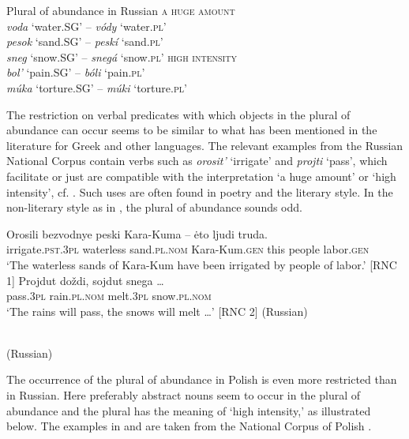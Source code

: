 \documentclass[output=paper,colorlinks,citecolor=brown,
]{langscibook}
\begin{document}
\ea\label{ex:41}	
Plural of abundance in Russian \citep[473]{Svedova1980} 
\ea \textsc{a huge amount}\\\textit{voda} `water.SG' -- \textit{vódy} `water.\textsc{pl}'\\ \textit{pesok} `sand.SG' -- \textit{peskí} `sand.\textsc{pl}'\\ 	\textit{sneg} `snow.SG' -- \textit{snegá} `snow.\textsc{pl}' 
\ex \textsc{high intensity}\\  \textit{bol'} `pain.SG' -- \textit{bóli} `pain.\textsc{pl}'\\ \textit{múka} `torture.SG' -- \textit{múki} `torture.\textsc{pl}'
\z\z
	
\noindent The restriction on verbal predicates with which objects in the plural of abundance can occur seems to be similar to what has been mentioned in the literature for Greek and other languages. The relevant examples from the Russian National Corpus contain verbs such as \textit{orosit'} `irrigate' and \textit{projti} `pass', which facilitate or just are compatible with the interpretation `a huge amount' or `high intensity', cf. . Such uses are often found in poetry and the literary style. In the non-literary style as in , the plural of abundance sounds odd. 

\ea\label{ex:42} 
\ea\gll Orosili bezvodnye peski Kara-Kuma {--} ėto ljudi truda. \\
irrigate.\textsc{pst.3pl} waterless sand.\textsc{pl.nom} Kara-Kum.\textsc{gen} {} this people labor.\textsc{gen} \\
\glt `The waterless sands of Kara-Kum have been irrigated by people of labor.' \hfill [RNC 1]
\label{ex:42a}
\ex\gll Projdut doždi, sojdut snega \ldots \\
pass.\textsc{3pl} rain.\textsc{pl.nom} melt.\textsc{3pl} snow.\textsc{pl.nom} \\
\glt `The rains will pass, the snows will melt \ldots' \hfill [RNC 2] 
\label{ex:42b}
\z\hfill (Russian)\z

\\\hfill (Russian)
\label{ex:43}
\z
	
\noindent The occurrence of the plural of abundance in Polish is even more restricted than in Russian. Here preferably abstract nouns seem to occur in the plural of abundance and the plural has the meaning of `high intensity,' as illustrated below. The examples in  and  are taken from the National Corpus of Polish \citep{PrzepiorkowskiLewandowska-Tomaszczyk2012}. 
\end{document}
